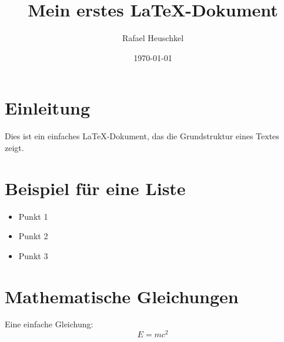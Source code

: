 \documentclass[a4paper, 12pt]{article}
\begin{document}
	
	\title{Mein erstes LaTeX-Dokument}
	\author{Rafael Heuschkel}
	\date{\today}
	
	\maketitle
	
	\section{Einleitung}
	Dies ist ein einfaches LaTeX-Dokument, das die Grundstruktur eines Textes zeigt.
	
	\section{Beispiel für eine Liste}
	\begin{itemize}
		\item Punkt 1
		\item Punkt 2
		\item Punkt 3
	\end{itemize}
	
	\section{Mathematische Gleichungen}
	Eine einfache Gleichung:
	\[
	E = mc^2
	\]
	
\end{document}
